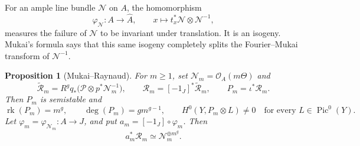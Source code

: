 \documentclass[a4paper]{amsart}
\newtheorem{proposition}[theorem]{Proposition}
\theoremstyle{remark}
\DeclareMathOperator{\Pic}{Pic}
\DeclareMathOperator{\rk}{rk}
\newcommand{\OO}{\mathcal O}
\begin{document}
For an ample line bundle \(\mathcal N\) on \(A\), the homomorphism
\[
 \varphi_{\mathcal N}:A\longrightarrow\widehat A,
 \qquad x\longmapsto t_x^*\mathcal N\otimes\mathcal N^{-1},
\]
measures the failure of \(\mathcal N\) to be invariant under translation.  It is an isogeny.  Mukai's formula says that this same isogeny completely splits the Fourier--Mukai transform of \(\mathcal N^{-1}\).

\begin{proposition}[Mukai--Raynaud]\label{prop:raynaud}
For \(m\geq 1\), set \(\mathcal N_m=\OO_A(m\Theta)\) and
\[
 \widetilde{\mathcal R}_m
 =R^gq_*\bigl(\mathcal P\otimes p^*\mathcal N_m^{-1}\bigr),
 \qquad
 \mathcal R_m=[-1_J]^*\widetilde{\mathcal R}_m,
 \qquad
 P_m=\iota^*\mathcal R_m.
\]
Then \(P_m\) is semistable and
\[
 \rk(P_m)=m^g,\qquad \deg(P_m)=g m^{g-1},\qquad
 H^0(Y,P_m\otimes L)\neq 0
 \quad\text{for every }L\in\Pic^0(Y).
\]
Let \(\varphi_m=\varphi_{\mathcal N_m}:A\to J\), and put
\(a_m=[-1_J]\circ\varphi_m\).  Then
\[
 a_m^*\mathcal R_m\simeq \mathcal N_m^{\oplus m^g}.
\]
\end{proposition}
\end{document}
